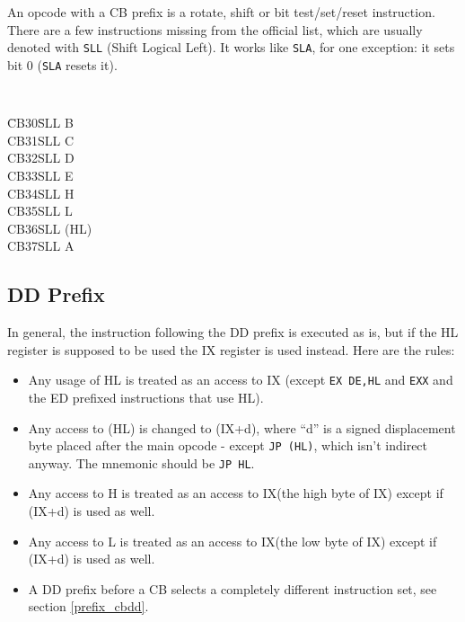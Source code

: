 An opcode with a CB prefix is a rotate, shift or bit test/set/reset instruction. There are a few instructions missing from the official list, which are usually denoted with {\tt SLL} (Shift Logical Left). It works like {\tt SLA}, for one exception: it sets bit 0 ({\tt SLA} resets it).

{\tt 
  \begin{tabbing}
    {\qquad}\=CB30\qquad\=SLL B \+\\
       CB31\>SLL C\\
       CB32\>SLL D\\
       CB33\>SLL E\\
       CB34\>SLL H\\
       CB35\>SLL L\\
       CB36\>SLL (HL)\\
       CB37\>SLL A
    \end{tabbing}
}


\subsection{DD Prefix \cite{gerton}}

In general, the instruction following the DD prefix is executed as is, but if the HL register is supposed to be used the IX register is used instead. Here are the rules:

\begin{itemize}[topsep=1pt,itemsep=1pt]
    \item Any usage of HL is treated as an access to IX (except {\tt EX DE,HL} and {\tt EXX} and the ED prefixed instructions that use HL).
	
    \item Any access to (HL) is changed to (IX+d), where ``d'' is a signed displacement byte placed after the main opcode - except {\tt JP (HL)}, which isn't indirect anyway. The mnemonic should be {\tt JP HL}.
	
    \item Any access to H is treated as an access to IX\High (the high byte of IX) except if (IX+d) is used as well.
	
    \item Any access to L is treated as an access to IX\Low (the low byte of IX) except if (IX+d) is used as well.
	
    \item A DD prefix before a CB selects a completely different instruction set, see section {\ref{prefix_cbdd}}.
\end{itemize}

